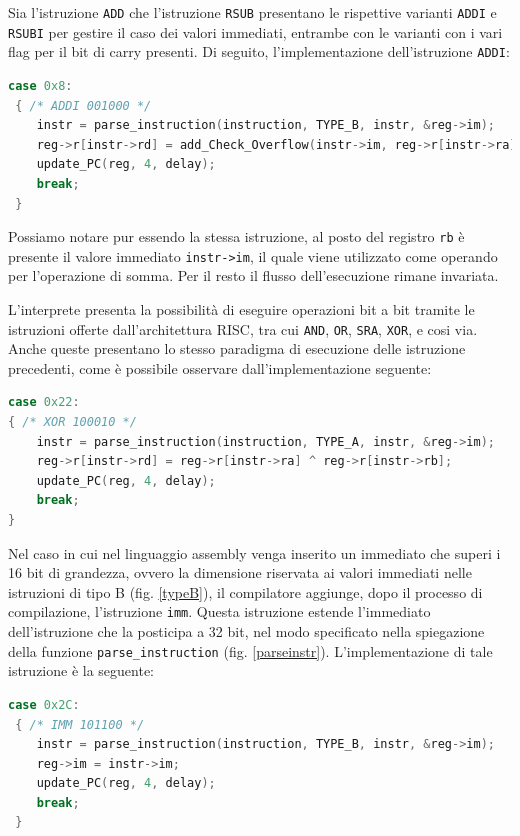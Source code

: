 \vspace{0.3cm}

\noindent Sia l'istruzione \texttt{ADD} che l'istruzione \texttt{RSUB} presentano le rispettive varianti \texttt{ADDI} e \texttt{RSUBI} per gestire il caso dei valori immediati, entrambe con le varianti con i vari flag per il bit di carry presenti. Di seguito, l'implementazione dell'istruzione \texttt{ADDI}:

\begin{lstlisting}[language=C]
 case 0x8:
 { /* ADDI 001000 */
    instr = parse_instruction(instruction, TYPE_B, instr, &reg->im);
    reg->r[instr->rd] = add_Check_Overflow(instr->im, reg->r[instr->ra], &carry);
    update_PC(reg, 4, delay);
    break;
 }
\end{lstlisting}
Possiamo notare pur essendo la stessa istruzione, al posto del registro \texttt{rb} è presente il valore immediato \texttt{instr->im}, il quale viene utilizzato come operando per l'operazione di somma. 
Per il resto il flusso dell'esecuzione rimane invariata.

\vspace{0.3cm}

L'interprete presenta la possibilità di eseguire operazioni bit a bit tramite le istruzioni offerte dall'architettura RISC, tra cui \texttt{AND}, \texttt{OR}, \texttt{SRA}, \texttt{XOR}, e cosi via.
Anche queste presentano lo stesso paradigma di esecuzione delle istruzione precedenti, come è possibile osservare dall'implementazione seguente: 

\begin{lstlisting}[language=C]
case 0x22:
{ /* XOR 100010 */
    instr = parse_instruction(instruction, TYPE_A, instr, &reg->im);
    reg->r[instr->rd] = reg->r[instr->ra] ^ reg->r[instr->rb];
    update_PC(reg, 4, delay);
    break;
}
\end{lstlisting}

Nel caso in cui nel linguaggio assembly venga inserito un immediato che superi i 16  bit di grandezza, ovvero la dimensione riservata ai valori immediati nelle istruzioni di tipo B (fig. \ref{typeB}), il compilatore aggiunge, dopo il processo di compilazione, l'istruzione \texttt{imm}. Questa istruzione estende l'immediato dell'istruzione che la posticipa a 32 bit, nel modo specificato nella spiegazione della funzione \texttt{parse\_instruction} (fig. \ref{parseinstr}). L'implementazione di tale istruzione è la seguente:

\begin{lstlisting}[language=C]
 case 0x2C:
 { /* IMM 101100 */
    instr = parse_instruction(instruction, TYPE_B, instr, &reg->im);
    reg->im = instr->im;
    update_PC(reg, 4, delay);
    break;
 }
\end{lstlisting}
\label{imm}

